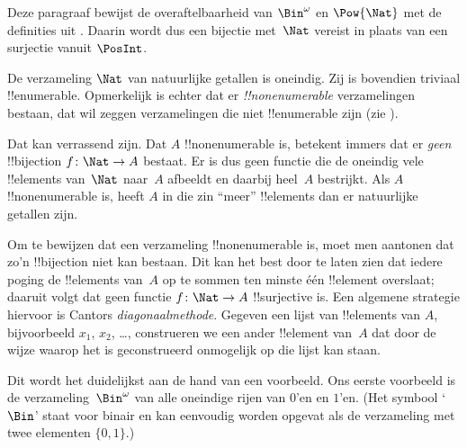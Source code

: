 \documentclass[../../../include/open-logic-section]{subfiles}
\begin{document}


\begin{editorial}
  Deze paragraaf bewijst de overaftelbaarheid van $\Bin^\omega$ en
  $\Pow{\Nat}$ met de definities uit . Daarin wordt
  dus een bijectie met~$\Nat$ vereist in plaats van een surjectie
  vanuit $\PosInt$.
\end{editorial}

\begin{explain}
De verzameling $\Nat$ van natuurlijke getallen is oneindig. Zij is
bovendien triviaal !!{enumerable}. Opmerkelijk is echter dat er
\emph{!!{nonenumerable}} verzamelingen bestaan, dat wil zeggen
verzamelingen die niet !!{enumerable} zijn (zie
).

Dat kan verrassend zijn. Dat $A$ !!{nonenumerable} is, betekent immers
dat er \emph{geen} !!{bijection} $f \colon \Nat \to A$ bestaat. Er is
dus geen functie die de oneindig vele !!{element}s van~$\Nat$ naar~$A$
afbeeldt en daarbij heel~$A$ bestrijkt. Als $A$ !!{nonenumerable} is,
heeft $A$ in die zin ``meer'' !!{element}s dan er natuurlijke getallen
zijn.

Om te bewijzen dat een verzameling !!{nonenumerable} is, moet men
aantonen dat zo'n !!{bijection} niet kan bestaan. Dit kan het best door
te laten zien dat iedere poging de !!{element}s van~$A$ op te sommen
ten minste één !!{element} overslaat; daaruit volgt dat geen functie
$f\colon \Nat \to A$ !!{surjective} is. Een algemene strategie
hiervoor is Cantors \emph{diagonaalmethode}. Gegeven een lijst van
!!{element}s van $A$, bijvoorbeeld $x_1$, $x_2$, \dots, construeren we
een ander !!{element} van~$A$ dat door de wijze waarop het is
geconstrueerd onmogelijk op die lijst kan staan.

Dit wordt het duidelijkst aan de hand van een voorbeeld. Ons eerste
voorbeeld is de verzameling~$\Bin^\omega$ van alle oneindige rijen van
$0$'en en $1$'en. (Het symbool `$\Bin$' staat voor binair en kan
eenvoudig worden opgevat als de verzameling met twee elementen
$\{0,1\}$.)
\end{explain}
\end{document}
